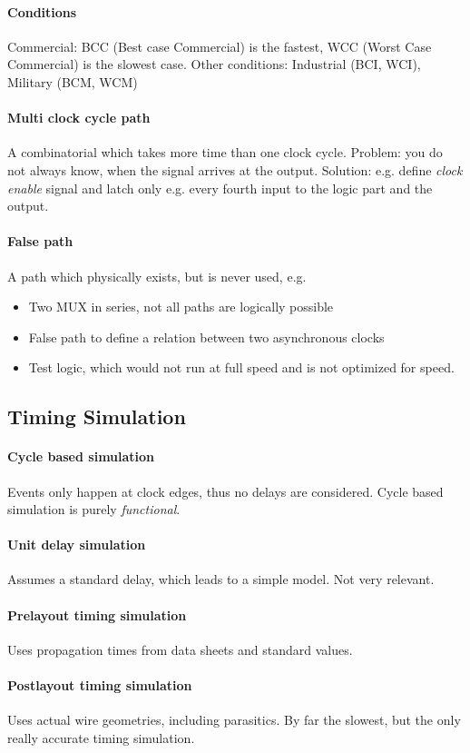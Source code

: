 \paragraph{Conditions}Commercial: BCC (Best case Commercial) is the fastest, WCC (Worst Case Commercial) is the slowest case. Other conditions: Industrial (BCI, WCI), Military (BCM, WCM) \\

\paragraph{Multi clock cycle path}A combinatorial which takes more time than one clock cycle. 
Problem: you do not always know, when the signal arrives at the output. 
Solution: e.g. define \emph{clock enable} signal and latch only e.g. every fourth input to the logic part and the output.

\paragraph{False path}A path which physically exists, but is never used, e.g.
\begin{itemize}
    \item Two MUX in series, not all paths are logically possible
    \item False path to define a relation between two asynchronous clocks
    \item Test logic, which would not run at full speed and is not optimized for speed.
\end{itemize}

\subsection{Timing Simulation}
\paragraph{Cycle based simulation}
Events only happen at clock edges, thus no delays are considered.
Cycle based simulation is purely \emph{functional}.
\paragraph{Unit delay simulation}
Assumes a standard delay, which leads to a simple model. Not very relevant.
\paragraph{Prelayout timing simulation}
Uses propagation times from data sheets and standard values.
\paragraph{Postlayout timing simulation}
Uses actual wire geometries, including parasitics.
By far the slowest, but the only really accurate timing simulation.

